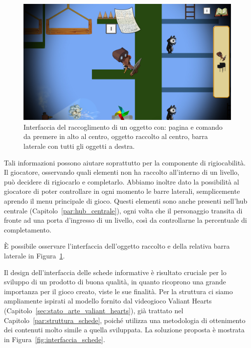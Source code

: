 \begin{figure}%
	\centering
	\includegraphics[width= 0.9\columnwidth]{images/gameDesign/57_interfaccia.jpg}
	\caption{Interfaccia del raccoglimento di un oggetto con: pagina e comando da premere in alto al centro, oggetto raccolto al centro, barra laterale con tutti gli oggetti a destra.}
	\label{fig:interfaccia_oggetti}
\end{figure}

Tali informazioni possono aiutare soprattutto per la componente di rigiocabilità. Il giocatore, osservando quali elementi non ha raccolto all’interno di un livello, può decidere di rigiocarlo e completarlo.
Abbiamo inoltre dato la possibilità al giocatore di poter controllare in ogni momento le barre laterali, semplicemente aprendo il menu principale di gioco.
Questi elementi sono anche presenti nell’hub centrale (Capitolo~\ref{par:hub_centrale}), ogni volta che il personaggio transita di fronte ad una porta d’ingresso di un livello, così da controllarne la percentuale di completamento.

È possibile osservare l'interfaccia dell'oggetto raccolto e della relativa barra laterale in Figura~\ref{fig:interfaccia_oggetti}.

Il design dell’interfaccia delle schede informative è risultato cruciale per lo sviluppo di un prodotto di buona qualità, in quanto ricoprono una grande importanza per il gioco creato, viste le sue finalità.
Per la struttura ci siamo ampliamente ispirati al modello fornito dal videogioco Valiant Hearts (Capitolo~\ref{sec:stato_arte_valiant_hearts}), già trattato nel Capitolo~\ref{par:struttura_schede}, poiché utilizza una metodologia di ottenimento dei contenuti molto simile a quella sviluppata.
La soluzione proposta è mostrata in Figura~\ref{fig:interfaccia_schede}.

